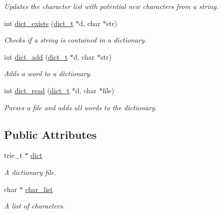 \begin{DoxyCompactItemize}
\begin{DoxyCompactList}\small\item\em Updates the character list with potential new characters from a string. \end{DoxyCompactList}\item 
int \mbox{\hyperlink{structdict__t_ada2e9cd98e98ccefe871124833a4cd77}{dict\+\_\+exists}} (\mbox{\hyperlink{structdict__t}{dict\+\_\+t}} $\ast$d, char $\ast$str)
\begin{DoxyCompactList}\small\item\em Checks if a string is contained in a dictionary. \end{DoxyCompactList}\item 
int \mbox{\hyperlink{structdict__t_ab4825a90819a79433cd1f4f6034b4fc1}{dict\+\_\+add}} (\mbox{\hyperlink{structdict__t}{dict\+\_\+t}} $\ast$d, char $\ast$str)
\begin{DoxyCompactList}\small\item\em Adds a word to a dictionary. \end{DoxyCompactList}\item 
int \mbox{\hyperlink{structdict__t_a4a2d3fd1ef3eba7b6e70d87129ad347f}{dict\+\_\+read}} (\mbox{\hyperlink{structdict__t}{dict\+\_\+t}} $\ast$d, char $\ast$file)
\begin{DoxyCompactList}\small\item\em Parses a file and adds all words to the dictionary. \end{DoxyCompactList}\end{DoxyCompactItemize}
\subsection*{Public Attributes}
\begin{DoxyCompactItemize}
\item 
\mbox{\label{structdict__t_a4743f4cde2360543d7976d68e0bfacee}} 
trie\+\_\+t $\ast$ \mbox{\hyperlink{structdict__t_a4743f4cde2360543d7976d68e0bfacee}{dict}}
\begin{DoxyCompactList}\small\item\em A dictionary file. \end{DoxyCompactList}\item 
\mbox{\label{structdict__t_a7bceea2e14139c9899276927ea4736c6}} 
char $\ast$ \mbox{\hyperlink{structdict__t_a7bceea2e14139c9899276927ea4736c6}{char\+\_\+list}}
\begin{DoxyCompactList}\small\item\em A list of characters. \end{DoxyCompactList}\end{DoxyCompactItemize}


